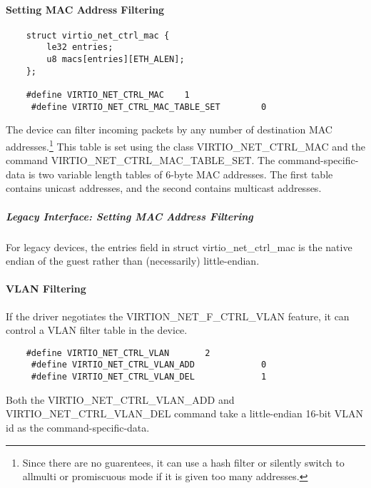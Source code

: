\paragraph{Setting MAC Address Filtering}\label{sec:Device Types / Network Device / Device Operation / Control Virtqueue / Setting MAC Address Filtering}

\begin{lstlisting}
	struct virtio_net_ctrl_mac {
		le32 entries;
		u8 macs[entries][ETH_ALEN];
	};

	#define VIRTIO_NET_CTRL_MAC    1
	 #define VIRTIO_NET_CTRL_MAC_TABLE_SET        0
\end{lstlisting}

The device can filter incoming packets by any number of destination
MAC addresses.\footnote{Since there are no guarentees, it can use a hash filter or
silently switch to allmulti or promiscuous mode if it is given too
many addresses.
} This table is set using the class
VIRTIO_NET_CTRL_MAC and the command VIRTIO_NET_CTRL_MAC_TABLE_SET. The
command-specific-data is two variable length tables of 6-byte MAC
addresses. The first table contains unicast addresses, and the second
contains multicast addresses.

\subparagraph{Legacy Interface: Setting MAC Address Filtering}\label{sec:Device Types / Network Device / Device Operation / Control Virtqueue / Setting MAC Address Filtering / Legacy Interface: Setting MAC Address Filtering}
For legacy devices, the entries field in struct virtio_net_ctrl_mac is the
native endian of the guest rather than (necessarily) little-endian.

\paragraph{VLAN Filtering}\label{sec:Device Types / Network Device / Device Operation / Control Virtqueue / VLAN Filtering}

If the driver negotiates the VIRTION_NET_F_CTRL_VLAN feature, it
can control a VLAN filter table in the device.

\begin{lstlisting}
	#define VIRTIO_NET_CTRL_VLAN       2
	 #define VIRTIO_NET_CTRL_VLAN_ADD             0
	 #define VIRTIO_NET_CTRL_VLAN_DEL             1
\end{lstlisting}

Both the VIRTIO_NET_CTRL_VLAN_ADD and VIRTIO_NET_CTRL_VLAN_DEL
command take a little-endian 16-bit VLAN id as the command-specific-data.

